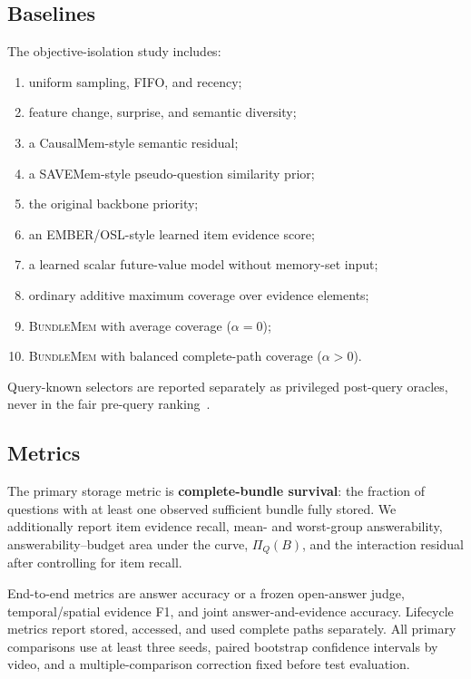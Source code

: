 \documentclass[10pt,twocolumn,letterpaper]{article}
\newcommand{\method}{\textnormal{\textsc{BundleMem}}\xspace}
\begin{document}
\subsection{Baselines}

The objective-isolation study includes:
\begin{enumerate}[leftmargin=*,itemsep=1pt]
    \item uniform sampling, FIFO, and recency;
    \item feature change, surprise, and semantic diversity;
    \item a CausalMem-style semantic residual;
    \item a SAVEMem-style pseudo-question similarity prior;
    \item the original backbone priority;
    \item an EMBER/OSL-style learned item evidence score;
    \item a learned scalar future-value model without memory-set input;
    \item ordinary additive maximum coverage over evidence elements;
    \item \method with average coverage ($\alpha=0$);
    \item \method with balanced complete-path coverage ($\alpha>0$).
\end{enumerate}
Query-known selectors are reported separately as privileged post-query oracles, never in the fair pre-query ranking~\cite{yamao2026questionguidedvisualcompressionmemory,qiu2026longvideor1smartnavigationlowcost}.

\subsection{Metrics}

The primary storage metric is \textbf{complete-bundle survival}: the fraction of questions with at least one observed sufficient bundle fully stored.
We additionally report item evidence recall, mean- and worst-group answerability, answerability--budget area under the curve, $\Pi_Q(B)$, and the interaction residual after controlling for item recall.

End-to-end metrics are answer accuracy or a frozen open-answer judge, temporal/spatial evidence F1, and joint answer-and-evidence accuracy.
Lifecycle metrics report stored, accessed, and used complete paths separately.
All primary comparisons use at least three seeds, paired bootstrap confidence intervals by video, and a multiple-comparison correction fixed before test evaluation.
\end{document}
